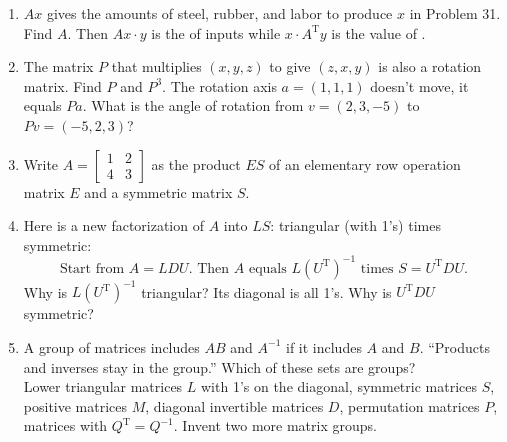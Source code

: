 \documentclass[14pt, a4paper]{article}
\begin{document}
\begin{enumerate}[resume]
    \item $Ax$ gives the amounts of steel, rubber, and labor to produce $x$ in Problem 31. Find $A$. Then $Ax \cdot y$ is the \underline{\hspace{2cm}} of inputs while $x \cdot A^{\mathrm{T}}y$ is the value of \underline{\hspace{2cm}}.

    \item The matrix $P$ that multiplies $(x,y,z)$ to give $(z,x,y)$ is also a rotation matrix. Find $P$ and $P^3$. The rotation axis $a = (1,1,1)$ doesn't move, it equals $Pa$. What is the angle of rotation from $v = (2,3,-5)$ to $Pv = (-5,2,3)$?

    \item Write $A = \begin{bmatrix}1 & 2 \\ 4 & 3\end{bmatrix}$ as the product $ES$ of an elementary row operation matrix $E$ and a symmetric matrix $S$.

    \item Here is a new factorization of $A$ into $LS$: triangular (with 1's) times symmetric:
          \[
              \text{Start from } A = LDU. \text{ Then } A \text{ equals } L(U^{\mathrm{T}})^{-1} \text{ times } S = U^{\mathrm{T}}DU.
          \]
          Why is $L(U^{\mathrm{T}})^{-1}$ triangular? Its diagonal is all 1's. Why is $U^{\mathrm{T}}DU$ symmetric?

    \item A group of matrices includes $AB$ and $A^{-1}$ if it includes $A$ and $B$. ``Products and inverses stay in the group.'' Which of these sets are groups?\\
          Lower triangular matrices $L$ with 1's on the diagonal, symmetric matrices $S$, positive matrices $M$, diagonal invertible matrices $D$, permutation matrices $P$, matrices with $Q^{\mathrm{T}} = Q^{-1}$. Invent two more matrix groups.

\end{enumerate}
\end{document}
